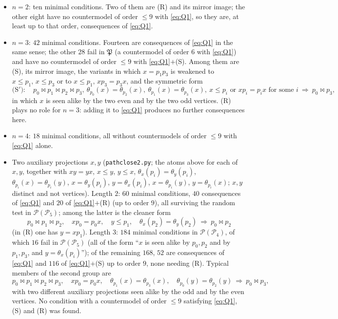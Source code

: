 \documentclass[11pt]{amsart}
\theoremstyle{definition}
\renewcommand{\P}{\mathcal{P}}
\newcommand{\mt}{\bowtie}   %
\begin{document}
\begin{itemize}[nosep]
\item $n=2$: ten minimal conditions. Two of them are (R) and its mirror image; the other eight have no countermodel of order $\le9$ with \eqref{eq:Q1}, so they are, at least up to that order, consequences of \eqref{eq:Q1}.
\item $n=3$: $42$ minimal conditions. Fourteen are consequences of \eqref{eq:Q1} in the same sense; the other $28$ fail in $\mathfrak P$ (a countermodel of order $6$ with \eqref{eq:Q1}) and have no countermodel of order $\le9$ with \eqref{eq:Q1}$+$(S). Among them are (S), its mirror image, the variants in which $x=p_1p_3$ is weakened to $x\le p_1,\,x\le p_3$ or to $x\le p_1,\,xp_3=p_3x$, and the symmetric form
\[
\text{(S$'$)}:\quad p_0\mt p_1\mt p_2\mt p_3,\ \theta_{p_0}(x)=\theta_{p_2}(x),\ \theta_{p_1}(x)=\theta_{p_3}(x),\ x\le p_i\text{ or }xp_i=p_ix\text{ for some }i\ \Longrightarrow\ p_0\mt p_3,
\]
in which $x$ is seen alike by the two even and by the two odd vertices. (R) plays no role for $n=3$: adding it to \eqref{eq:Q1} produces no further consequences here.
\item $n=4$: $18$ minimal conditions, all without countermodels of order $\le9$ with \eqref{eq:Q1} alone.
\item Two auxiliary projections $x,y$ (\texttt{pathclose2.py}; the atoms above for each of $x,y$, together with $xy=yx$, $x\le y$, $y\le x$, $\theta_x(p_i)=\theta_y(p_i)$, $\theta_{p_i}(x)=\theta_{p_i}(y)$, $x=\theta_y(p_i)$, $y=\theta_x(p_i)$, $x=\theta_{p_i}(y)$, $y=\theta_{p_i}(x)$; $x,y$ distinct and not vertices). Length $2$: $60$ minimal conditions, $40$ consequences of \eqref{eq:Q1} and $20$ of \eqref{eq:Q1}$+$(R) (up to order $9$), all surviving the random test in $\P(\P_5)$; among the latter is the cleaner form
\[
p_0\mt p_1\mt p_2,\quad xp_0=p_0x,\quad y\le p_1,\quad \theta_x(p_2)=\theta_y(p_2)\ \Longrightarrow\ p_0\mt p_2
\]
(in (R) one has $y=xp_1$). Length $3$: $184$ minimal conditions in $\P(\P_4)$, of which $16$ fail in $\P(\P_5)$ (all of the form ``$x$ is seen alike by $p_0,p_2$ and by $p_1,p_3$, and $y=\theta_x(p_i)$''); of the remaining $168$, $52$ are consequences of \eqref{eq:Q1} and $116$ of \eqref{eq:Q1}$+$(S) up to order $9$, none needing (R). Typical members of the second group are
\[
p_0\mt p_1\mt p_2\mt p_3,\quad xp_0=p_0x,\quad \theta_{p_1}(x)=\theta_{p_3}(x),\quad \theta_{p_0}(y)=\theta_{p_2}(y)\ \Longrightarrow\ p_0\mt p_3 ,
\]
with two different auxiliary projections seen alike by the odd and by the even vertices. No condition with a countermodel of order $\le9$ satisfying \eqref{eq:Q1}, (S) and (R) was found.
\end{itemize}
\end{document}

